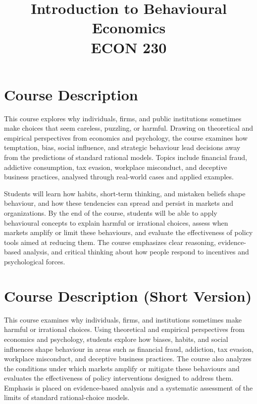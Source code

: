 \documentclass[12pt]{article}
\title{\textbf{Introduction to Behavioural Economics}\\[6pt]
\textbf{ECON 230}}
\author{}
\date{}
\begin{document}
\maketitle

\section*{Course Description}

This course explores why individuals, firms, and public institutions sometimes make choices that seem careless, puzzling, or harmful. Drawing on theoretical and empirical perspectives from economics and psychology, the course examines how temptation, bias, social influence, and strategic behaviour lead decisions away from the predictions of standard rational models. Topics include financial fraud, addictive consumption, tax evasion, workplace misconduct, and deceptive business practices,  analysed through real-world cases and applied examples.

Students will learn how habits, short-term thinking, and mistaken beliefs shape behaviour, and how these tendencies can spread and persist in markets and organizations. By the end of the course, students will be able to apply behavioural concepts to explain harmful or irrational choices, assess when markets amplify or limit these behaviours, and evaluate the effectiveness of policy tools aimed at reducing them. The course emphasizes clear reasoning, evidence-based analysis, and critical thinking about how people respond to incentives and psychological forces.



\section*{Course Description (Short Version)}
This course examines why individuals, firms, and institutions sometimes make harmful or irrational choices. Using theoretical and empirical perspectives from economics and psychology, students explore how biases, habits, and social influences shape behaviour in areas such as financial fraud, addiction, tax evasion, workplace misconduct, and deceptive business practices. The course also analyzes the conditions under which markets amplify or mitigate these behaviours and evaluates the effectiveness of policy interventions designed to address them.  Emphasis is placed on evidence-based analysis and a systematic assessment of the limits of standard rational-choice models.
\end{document}
